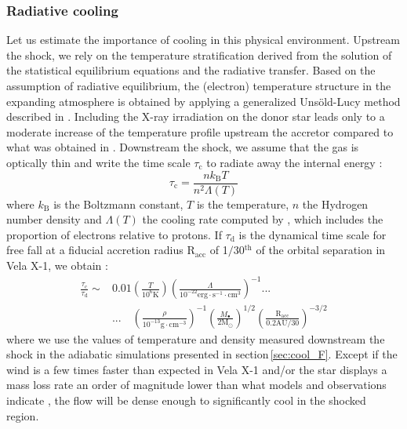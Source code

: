 \documentclass{aa}
\begin{document}
\subsubsection{Radiative cooling}
\label{sec:cool}

Let us estimate the importance of cooling in this physical environment. Upstream the shock, we rely on the temperature stratification derived from the solution of the statistical equilibrium equations and the radiative transfer. Based on the assumption of radiative equilibrium, the (electron) temperature structure in the expanding atmosphere is obtained by applying a generalized Uns{\"o}ld-Lucy method described in \citet{Hamann1998}. Including the X-ray irradiation on the donor star leads only to a moderate increase of the temperature profile upstream the accretor compared to what was obtained in \cite{Sander2017}. Downstream the shock, we assume that the gas is optically thin and write the time scale $\tau_{\text{c}}$ to radiate away the internal energy : 
\begin{equation}
\tau_{\text{c}}=\frac{nk_{\text{B}}T}{n^2\Lambda\left(T\right)}
\end{equation}
where $k_{\text{B}}$ is the Boltzmann constant, $T$ is the temperature, $n$ the Hydrogen number density and $\Lambda\left(T\right)$ the cooling rate computed by \cite{Schure2009}, which includes the proportion of electrons relative to protons. If $\tau_{\text{d}}$ is the dynamical time scale for free fall at a fiducial accretion radius R$_{\text{acc}}$ of 1$/$30$^{\text{th}}$ of the orbital separation in Vela X-1, we obtain :
\begin{align}
\frac{\tau_{\text{c}}}{\tau_{\text{d}}}\sim & 0.01\left(\frac{T}{10^6\text{K}}\right)\left(\frac{\Lambda}{10^{-22}\text{erg}\cdot\text{s}^{-1}\cdot\text{cm}^{3}}\right)^{-1} \text{...}\\
&  \text{...} \quad \left(\frac{\rho}{10^{-13}\text{g}\cdot\text{cm}^{-3}}\right)^{-1}\left(\frac{M_{\bullet}}{2\text{M}_{\odot}}\right)^{1/2}\left(\frac{\text{R}_{\text{acc}}}{0.2\text{AU}/30}\right)^{-3/2}
\end{align}
where we use the values of temperature and density measured downstream the shock in the adiabatic simulations presented in section\,\ref{sec:cool_F}. Except if the wind is a few times faster than expected in Vela X-1 and/or the star displays a mass loss rate an order of magnitude lower than what models and observations indicate \cite[$\sim$1.3$\cdot 10^{-6}$M$_{\odot}\cdot$yr$^{-1}$,][]{Gimenez-Garcia2016}, the flow will be dense enough to significantly cool in the shocked region.
\end{document}
